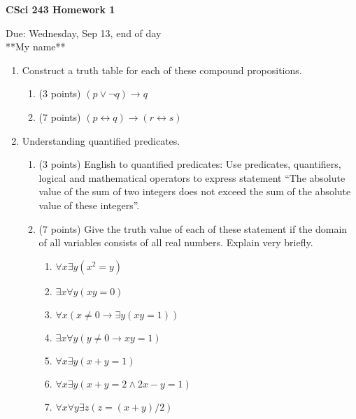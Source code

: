 \documentclass[11pt]{article}
\begin{document}
\begin{center}             %
\begin{LARGE}
{\bf CSci 243 Homework 1}
\end{LARGE}
\vskip 0.25cm      %

Due: Wednesday, Sep 13, end of day  \\  %
**My name**
\end{center}


\begin{enumerate}

\item Construct a truth table for each of these compound propositions.
\begin{enumerate}
\item (3 points) $(p\lor \lnot q)\rightarrow q$
\item (7 points) $(p\leftrightarrow q)\rightarrow (r\leftrightarrow s)$
\end{enumerate}

\item Understanding quantified predicates.
\begin{enumerate}
\item (3 points) English to quantified predicates: 
Use predicates, quantifiers, logical and mathematical operators to express statement 
``The absolute value of the sum of two integers does not exceed the sum of the absolute value of these integers''.
\item (7 points) 
Give the truth value of each of these statement if the domain of all variables consists of all real numbers. 
Explain very briefly.
\begin{enumerate}
\item $\forall x\exists y (x^2 = y)$
\item $\exists x\forall y (xy = 0)$
\item $\forall x (x\neq 0 \rightarrow \exists y (xy=1))$
\item $\exists x\forall y (y\neq 0 \rightarrow xy =1)$
\item $\forall x\exists y (x+y=1)$
\item $\forall x\exists y (x+y=2 \land 2x-y = 1)$
\item $\forall x \forall y \exists z  (z=(x+y)/2)$
\end{enumerate}
\end{enumerate}


\end{enumerate}
\end{document}
